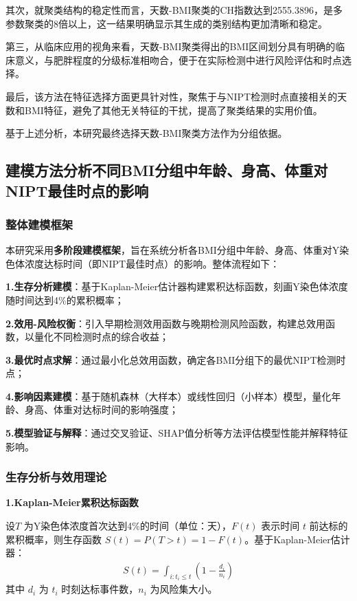 \documentclass{article}
\begin{document}
其次，就聚类结构的稳定性而言，天数-BMI聚类的CH指数达到2555.3896，是多参数聚类的8倍以上，这一结果明确显示其生成的类别结构更加清晰和稳定。

第三，从临床应用的视角来看，天数-BMI聚类得出的BMI区间划分具有明确的临床意义，与肥胖程度的分级标准相吻合，便于在实际检测中进行风险评估和时点选择。

最后，该方法在特征选择方面更具针对性，聚焦于与NIPT检测时点直接相关的天数和BMI特征，避免了其他无关特征的干扰，提高了聚类结果的实用价值。

基于上述分析，本研究最终选择天数-BMI聚类方法作为分组依据。
\subsection{\textbf{建模方法分析不同BMI分组中年龄、身高、体重对NIPT最佳时点的影响}}
\subsubsection{\textbf{整体建模框架}}
本研究采用\textbf{多阶段建模框架}，旨在系统分析各BMI分组中年龄、身高、体重对Y染色体浓度达标时间（即NIPT最佳时点）的影响。整体流程如下：

\textbf{1.生存分析建模}：基于Kaplan-Meier估计器构建累积达标函数，刻画Y染色体浓度随时间达到4\%的累积概率；

\textbf{2.效用-风险权衡}：引入早期检测效用函数与晚期检测风险函数，构建总效用函数，以量化不同检测时点的综合收益；

\textbf{3.最优时点求解}：通过最小化总效用函数，确定各BMI分组下的最优NIPT检测时点；

\textbf{4.影响因素建模}：基于随机森林（大样本）或线性回归（小样本）模型，量化年龄、身高、体重对达标时间的影响强度；

\textbf{5.模型验证与解释}：通过交叉验证、SHAP值分析等方法评估模型性能并解释特征影响。
\subsubsection{\textbf{生存分析与效用理论}}
\textbf{1.Kaplan-Meier累积达标函数}

设$ T $ 为Y染色体浓度首次达到4\%的时间（单位：天），$ F(t) $ 表示时间 $ t $ 前达标的累积概率，则生存函数
$ S(t) = P(T > t) = 1 - F(t) $。基于Kaplan-Meier估计器：
\begin{gather}
    S(t)=\int_{i:t_i\leq t}(1-\frac{d_i}{n_i}) \tag{11}
\end{gather}
其中 $ d_i $ 为 $ t_i $ 时刻达标事件数，$ n_i $ 为风险集大小。
\end{document}
